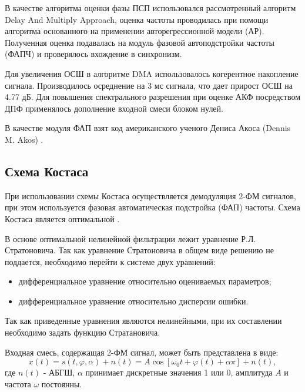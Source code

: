 В качестве алгоритма оценки фазы ПСП использовался
рассмотренный алгоритм Delay And Multiply Approach, оценка частоты проводилась при помощи алгоритма основанного на применении авторегрессионной модели (АР).
Полученная оценка подавалась на модуль фазовой автоподстройки частоты (ФАПЧ) и проверялось вхождение в синхронизм.

Для увеличения ОСШ в алгоритме DMA использовалось когерентное накопление сигнала. Производилось осреднение на 3 мс сигнала, что дает прирост ОСШ на 4.77 дБ.
Для повышения спектрального разрешения при оценке АКФ посредством ДПФ применялось дополнение входной смеси блоком нулей.

В качестве модуля ФАП взят код американского ученого Дениса Акоса (Dennis M. Akos) \cite{sandiaproject}.
\subsection{Схема Костаса}

При использовании схемы Костаса осуществляется демодуляция 2-ФМ сигналов, при этом используется фазовая автоматическая подстройка (ФАП) частоты. Схема
Костаса является оптимальной \cite{shahtarin-wiener-kalman}.

В основе оптимальной нелинейной фильтрации лежит уравнение Р.Л. Стратоновича. Так как уравнение Стратоновича в общем виде решению не поддается, необходимо
перейти к системе двух уравнений:
\begin{itemize}
	\item дифференциальное уравнение относительно оцениваемых параметров;
	\item дифференциальное уравнение относительно дисперсии ошибки.
\end{itemize}

Так как приведенные уравнения являются нелинейными, при их составлении необходимо задать функцию Стратановича.

Входная смесь, содержащая 2-ФМ сигнал, может быть представлена в виде:
\begin{equation}
	x(t) = s(t, \varphi, \alpha) + n(t) = A \cos \left[ \omega_0t + \varphi(t) +\alpha \pi \right] + n(t),
	\label{eq:sec4_sig}
\end{equation}
где ${n(t)}$ - АБГШ, ${\alpha}$ принимает дискретные значения 1 или 0, амплитуда ${A}$ и частота ${\omega}$ постоянны.

